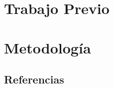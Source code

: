 \documentclass{antclass}
\begin{document}

\chapter{Trabajo Previo}






\chapter{Metodología}











%
%
\section{Referencias}


\end{document}
